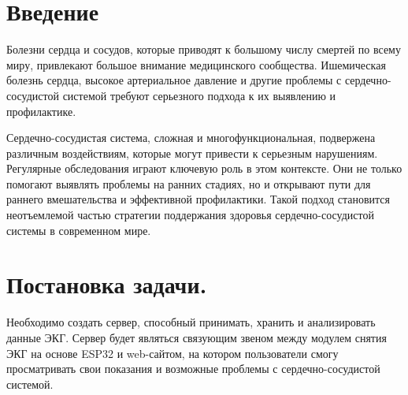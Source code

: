 \documentclass[12pt, russian]{extarticle}
\begin{document}
    \begin{spacing}{1.5}


    \tableofcontents
    \thispagestyle{empty}
    \newpage

    \pagestyle{plain}
    \setcounter{page}{3}

    \newpage
    \section{Введение}

    Болезни сердца и сосудов, которые приводят к большому числу смертей по всему миру,
    привлекают большое внимание медицинского сообщества. Ишемическая болезнь сердца, высокое
    артериальное давление и другие проблемы с сердечно-сосудистой системой требуют серьезного
    подхода к их выявлению и профилактике.

    Сердечно-сосудистая система, сложная и многофункциональная, подвержена различным воздействиям,
    которые могут привести к серьезным нарушениям. Регулярные обследования играют ключевую роль в этом
    контексте. Они не только помогают выявлять проблемы на ранних стадиях, но и открывают пути для
    раннего вмешательства и эффективной профилактики. Такой подход становится неотъемлемой частью
    стратегии поддержания здоровья сердечно-сосудистой системы в современном мире.

    \newpage
    \section{Постановка задачи.}

    Необходимо создать сервер, способный принимать, хранить и анализировать данные ЭКГ.
    Сервер будет являться связующим звеном между модулем снятия ЭКГ на основе ESP32 и web-сайтом,
    на котором пользователи смогу просматривать свои показания и возможные проблемы с сердечно-сосудистой
    системой.


\end{spacing}
\end{document}
